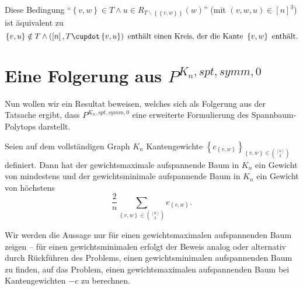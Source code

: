 \documentclass[10p,a4paper,BCOR = 12mm, DIV=15]{scrbook}
\begin{document}
{\begin{Bem}
Diese Bedingung "`$\left\{v, w\right\}\in T \wedge u\in R_{T\backslash \left\{\left\{v, w\right\}\right\}}\left(w\right)$"' (mit $\left(v, w, u\right) \in \left[n\right]^{\underline{3}}$) ist äquivalent zu
\begin{displaymath}
\left\{v, u\right\}\notin T\wedge\left(\left[n\right], T \cupdot \left\{v, u\right\}\right)\textnormal{ enthält einen Kreis, der die Kante }\left\{v, w\right\}\textnormal{ enthält}.
\end{displaymath} 
\end{Bem}

\section{Eine Folgerung aus $P^{K_n, spt, symm, 0}$}

\label{chap:neu_symm}

Nun wollen wir ein Resultat beweisen, welches sich als Folgerung aus der Tatsache ergibt, dass $P^{K_n, spt, symm, 0}$ eine erweiterte Formulierung des Spannbaum-Polytops darstellt.

\begin{Sa}
\label{sa:folgerung_erw_form}
Seien auf dem vollständigen Graph $K_n$ Kantengewichte $\left\{c_{\left\{v, w\right\}}\right\}_{\left\{v, w\right\}\in {\left[n\right] \choose 2}}$ definiert.
Dann hat der gewichtsmaximale aufspannende Baum in $K_n$ ein Gewicht von mindestens und der gewichtsminimale aufspannende Baum in $K_n$ ein Gewicht von höchstens
\begin{displaymath}
\frac{2}{n}\sum_{\left\{v, w\right\}\in{\left[n\right]\choose 2}} c_{\left\{v, w\right\}}.
\end{displaymath}
\end{Sa}
\begin{bew}
Wir werden die Aussage nur für einen gewichtsmaximalen aufspannenden Baum zeigen -- für einen gewichtsminimalen erfolgt der Beweis analog oder alternativ durch Rückführen des Problems, einen gewichtsminimalen aufspannenden Baum zu finden, auf das Problem, einen gewichtsmaximalen aufspannenden Baum bei Kantengewichten $-c$ zu berechnen.


\end{bew}}
\end{document}
